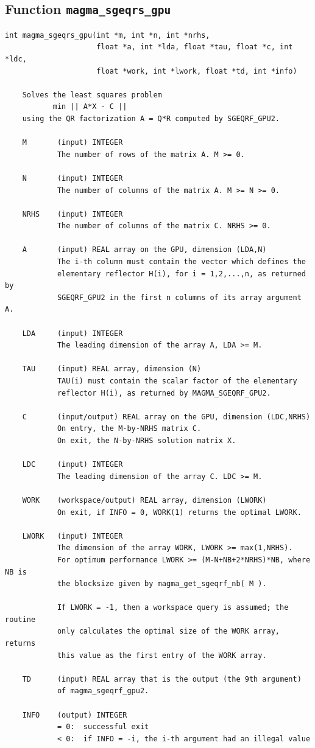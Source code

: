 \documentclass[10pt]{book}
\begin{document}
\newpage
\subsection{Function {\tt {\bf magma\_sgeqrs\_gpu}}}
\begin{verbatim}
int magma_sgeqrs_gpu(int *m, int *n, int *nrhs,
                     float *a, int *lda, float *tau, float *c, int *ldc,
                     float *work, int *lwork, float *td, int *info)

    Solves the least squares problem
           min || A*X - C ||
    using the QR factorization A = Q*R computed by SGEQRF_GPU2.

    M       (input) INTEGER
            The number of rows of the matrix A. M >= 0.

    N       (input) INTEGER
            The number of columns of the matrix A. M >= N >= 0.

    NRHS    (input) INTEGER
            The number of columns of the matrix C. NRHS >= 0.

    A       (input) REAL array on the GPU, dimension (LDA,N)
            The i-th column must contain the vector which defines the
            elementary reflector H(i), for i = 1,2,...,n, as returned by
            SGEQRF_GPU2 in the first n columns of its array argument A.

    LDA     (input) INTEGER
            The leading dimension of the array A, LDA >= M.

    TAU     (input) REAL array, dimension (N)
            TAU(i) must contain the scalar factor of the elementary
            reflector H(i), as returned by MAGMA_SGEQRF_GPU2.

    C       (input/output) REAL array on the GPU, dimension (LDC,NRHS)
            On entry, the M-by-NRHS matrix C.
            On exit, the N-by-NRHS solution matrix X.

    LDC     (input) INTEGER
            The leading dimension of the array C. LDC >= M.

    WORK    (workspace/output) REAL array, dimension (LWORK)
            On exit, if INFO = 0, WORK(1) returns the optimal LWORK.

    LWORK   (input) INTEGER
            The dimension of the array WORK, LWORK >= max(1,NRHS).
            For optimum performance LWORK >= (M-N+NB+2*NRHS)*NB, where NB is
            the blocksize given by magma_get_sgeqrf_nb( M ).

            If LWORK = -1, then a workspace query is assumed; the routine
            only calculates the optimal size of the WORK array, returns
            this value as the first entry of the WORK array.

    TD      (input) REAL array that is the output (the 9th argument)
            of magma_sgeqrf_gpu2.

    INFO    (output) INTEGER
            = 0:  successful exit
            < 0:  if INFO = -i, the i-th argument had an illegal value
\end{verbatim}
\end{document}
